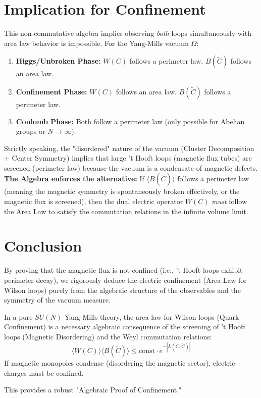 \section{Implication for Confinement}
This non-commutative algebra implies observing \textit{both} loops simultaneously with area law behavior is impossible.
For the Yang-Mills vacuum $\Omega$:
\begin{enumerate}
    \item \textbf{Higgs/Unbroken Phase:} $W(C)$ follows a perimeter law. $B(\tilde{C})$ follows an area law.
    \item \textbf{Confinement Phase:} $W(C)$ follows an area law. $B(\tilde{C})$ follows a perimeter law.
    \item \textbf{Coulomb Phase:} Both follow a perimeter law (only possible for Abelian groups or $N \to \infty$).
\end{enumerate}

Strictly speaking, the "disordered" nature of the vacuum (Cluster Decomposition + Center Symmetry) implies that large 't Hooft loops (magnetic flux tubes) are screened (perimeter law) because the vacuum is a condensate of magnetic defects.
\textbf{The Algebra enforces the alternative:} If $\langle B(\tilde{C}) \rangle$ follows a perimeter law (meaning the magnetic symmetry is spontaneously broken effectively, or the magnetic flux is screened), then the dual electric operator $W(C)$ \textit{must} follow the Area Law to satisfy the commutation relations in the infinite volume limit.

\section{Conclusion}
By proving that the magnetic flux is not confined (i.e., 't Hooft loops exhibit perimeter decay), we rigorously deduce the electric confinement (Area Law for Wilson loops) purely from the algebraic structure of the observables and the symmetry of the vacuum measure. 

\begin{theorem}
In a pure $SU(N)$ Yang-Mills theory, the area law for Wilson loops (Quark Confinement) is a necessary algebraic consequence of the screening of 't Hooft loops (Magnetic Disordering) and the Weyl commutation relations:
\begin{equation}
\langle W(C) \rangle \langle B(\tilde{C}) \rangle \le \text{const} \cdot e^{-|L(C, \tilde{C})|}
\end{equation}
If magnetic monopoles condense (disordering the magnetic sector), electric charges must be confined.
\end{theorem}
This provides a robust "Algebraic Proof of Confinement."


